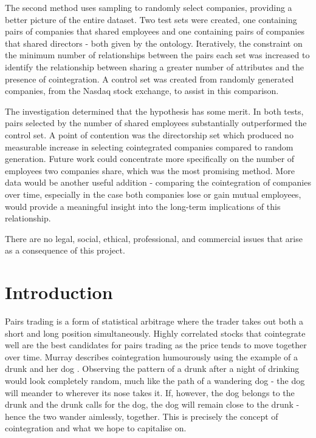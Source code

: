 \documentclass{UoYCSproject}
\begin{document}
\begin{summary}
The second method uses sampling to randomly select companies, providing a better picture of the entire dataset. Two test sets were created, one containing pairs of companies that shared employees and one containing pairs of companies that shared directors - both given by the ontology. Iteratively, the constraint on the minimum number of relationships between the pairs each set was increased to identify the relationship between sharing a greater number of attributes and the presence of cointegration. A control set was created from randomly generated companies, from the Nasdaq stock exchange, to assist in this comparison.

The investigation determined that the hypothesis has some merit. In both tests, pairs selected by the number of shared employees substantially outperformed the control set. A point of contention was the directorship set which produced no measurable increase in selecting cointegrated companies compared to random generation. Future work could concentrate more specifically on the number of employees two companies share, which was the most promising method. More data would be another useful addition - comparing the cointegration of companies over time, especially in the case both companies lose or gain mutual employees, would provide a meaningful insight into the long-term implications of this relationship.

There are no legal, social, ethical, professional, and commercial issues that arise as a consequence of this project.
\end{summary}

\chapter{Introduction}
\label{cha:Introduction}

Pairs trading is a form of statistical arbitrage where the trader takes out both a short and long position simultaneously. Highly correlated stocks that cointegrate well are the best candidates for pairs trading as the price tends to move together over time. Murray describes cointegration humourously using the example of a drunk and her dog \parencite{drunkdog}. Observing the pattern of a drunk after a night of drinking would look completely random, much like the path of a wandering dog - the dog will meander to wherever its nose takes it. If, however, the dog belongs to the drunk and the drunk calls for the dog, the dog will remain close to the drunk - hence the two wander aimlessly, together. This is precisely the concept of cointegration and what we hope to capitalise on.
\end{document}
